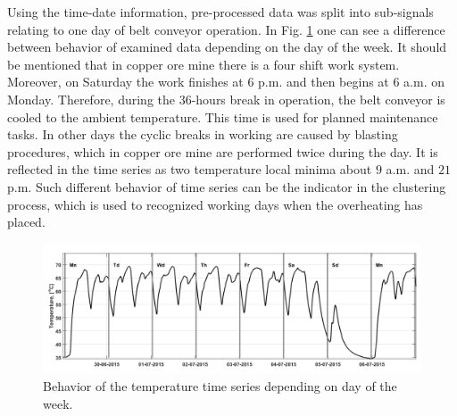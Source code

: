 Using the time-date information, pre-processed data was split into sub-signals relating to one day of belt conveyor operation. In Fig. \ref{fig: L222_55_days} one can see a difference between behavior of examined data depending on the day of the week. It should be mentioned that in copper ore mine there is a four shift work system. Moreover, on Saturday the work finishes at 6 p.m. and then begins at 6 a.m. on Monday. Therefore, during the $36$-hours break in operation, the belt conveyor is cooled to the ambient temperature. This time is used for planned maintenance tasks. In other days the cyclic breaks in working are caused by blasting procedures, which in copper ore mine are performed twice during the day. It is reflected in the time series as two temperature local minima about $9$ a.m. and $21$ p.m. Such different behavior of time series can be the indicator in the clustering process, which is used to recognized working days when the overheating has placed.
\begin{figure}[ht!]
\vspace{-15pt}
\centering
\includegraphics[width = \textwidth]{Wykresy/days.png}
\caption{Behavior of the temperature time series depending on day of the week.}
\label{fig: L222_55_days}
\vspace{-40pt}
\end{figure}
